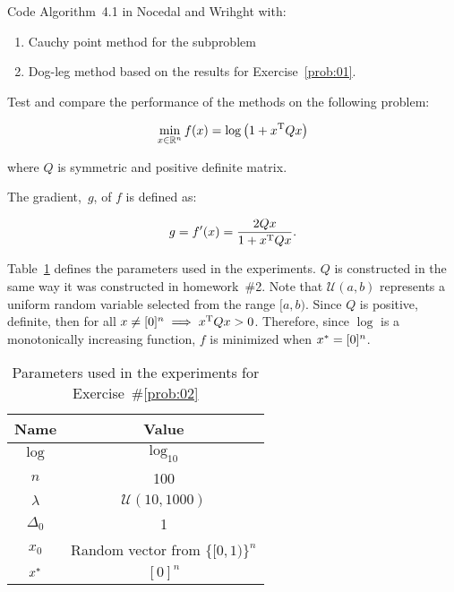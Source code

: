 \begin{problem}\label{prob:02}%
  Code Algorithm~4.1 in Nocedal and Wrihght with:
  
  \begin{enumerate}
    \item Cauchy point method for the subproblem
    \item Dog-leg method based on the results for Exercise~\ref{prob:01}.
  \end{enumerate}

  \noindent
  Test and compare the performance of the methods on the following problem:
  
  \[\min_{x\in \mathbb{R}^n} f(x) = \log\left(1+x^{\textnormal{T}} Qx\right)\]
  
  \noindent
  where $Q$ is symmetric and positive definite matrix.
\end{problem}


The gradient,~$g$, of $f$ is defined as: 

\[g = f'(x) = \frac{2Qx}{1+x^{\textnormal{T}} Q x}\text{.}\]

\noindent
Table~\ref{tab:p02:experimentParameters} defines the parameters used in the experiments.  $Q$ is constructed in the same way it was constructed in homework~\#2.  Note that $\mathcal{U}(a,b)$ represents a uniform random variable selected from the range $[a,b)$. Since $Q$ is positive, definite, then for all $x \ne [0]^n \implies x^{\textnormal{T}} Q x > 0$.  Therefore, since $\log$ is a monotonically increasing function, $f$ is minimized when $x^{*} = [0]^n$.

\begin{table}[h]
  \caption{Parameters used in the experiments for Exercise~\#\ref{prob:02}}\label{tab:p02:experimentParameters}
  \centering
  \begin{tabular}{|c|c|}
    \hline
    \textbf{Name} & \textbf{Value} \\\hline
    \hline
    $\log$      &   $\log_{10}$\\\hline
    $n$         &   100\\\hline
    $\lambda$   &   $\mathcal{U}(10,1000)$ \\\hline
    $\Delta_0$  &   1 \\\hline
    $x_0$       &   Random vector from $\{[0,1)\}^{n}$\\\hline
    $x^{*}$     &   $[0]^n$\\\hline
  \end{tabular}
\end{table}



